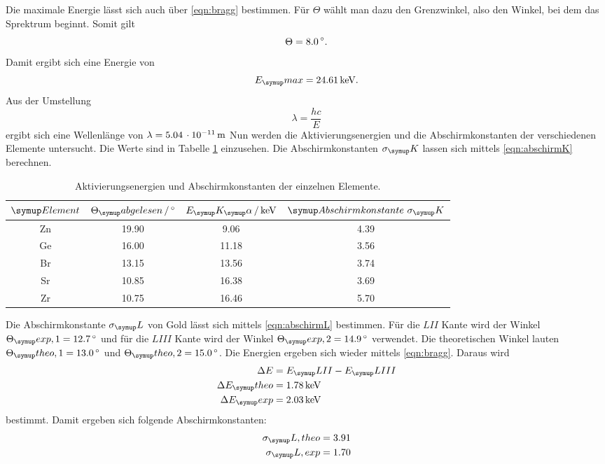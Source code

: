 Die maximale Energie lässt sich auch über \eqref{eqn:bragg} bestimmen. Für $\Theta$
wählt man dazu den Grenzwinkel, also den Winkel, bei dem das Sprektrum beginnt.
Somit gilt
\begin{equation}
  \Theta = 8.0 \,\si{\degree}.
\end{equation}
Damit ergibt sich eine Energie von
\begin{equation}
  E_\su{max} = 24.61 \keV.
\end{equation}
Aus der Umstellung
\begin{equation}
  \lambda = \frac{hc}{E}
\end{equation}
ergibt sich eine Wellenlänge von $\lambda=5.04\,\cdot10^{-11}\,\si{\meter}$
Nun werden die Aktivierungsenergien und die Abschirmkonstanten
der verschiedenen Elemente untersucht. Die
Werte sind in Tabelle \ref{tab:Energie} einzusehen. Die Abschirmkonstanten $\sigma_\su{K}$
lassen sich mittels \eqref{eqn:abschirmK} berechnen.
\begin{table}
  \centering
  \begin{tabular}{c c c c}
    \toprule
    $\su{Element}$ & $\Theta_\su{abgelesen} \,/\dgr$ & $E_\su{K_\su{\alpha}}\,/ \keV$ & $\su{Abschirmkonstante}\,\,\sigma_\su{K}$\\
    \midrule
    Zn & 19.90 &  9.06 & 4.39   \\
    Ge & 16.00 & 11.18 & 3.56   \\
    Br & 13.15 & 13.56 & 3.74   \\
    Sr & 10.85 & 16.38 & 3.69   \\
    Zr & 10.75 & 16.46 & 5.70   \\
    \bottomrule
  \end{tabular}
  \caption{Aktivierungsenergien und Abschirmkonstanten der einzelnen Elemente.}
  \label{tab:Energie}
\end{table}
Die Abschirmkonstante $\sigma_\su{L}$
von Gold lässt sich mittels \eqref{eqn:abschirmL} bestimmen.
Für die $LII$ Kante wird der Winkel $\Theta_\su{exp,1} = 12.7 \dgr$ und für die $LIII$ Kante
wird der Winkel $\Theta_\su{exp,2} = 14.9 \dgr$ verwendet. Die theoretischen Winkel lauten
$\Theta_\su{theo,1} = 13.0 \dgr$ und $\Theta_\su{theo,2} = 15.0 \dgr$.
Die Energien ergeben sich wieder mittels \eqref{eqn:bragg}. Daraus wird
\begin{align*}
  \Delta E &= E_\su{LII} - E_\su{LIII} \\
  \Delta E_\su{theo} &= 1.78 \keV \\
  \Delta E_\su{exp} &= 2.03 \keV \\
\end{align*}
bestimmt.
Damit ergeben sich folgende Abschirmkonstanten:
\begin{align*}
  \sigma_\su{L, theo} &= 3.91  \\
  \sigma_\su{L, exp} &= 1.70 \\
\end{align*}

